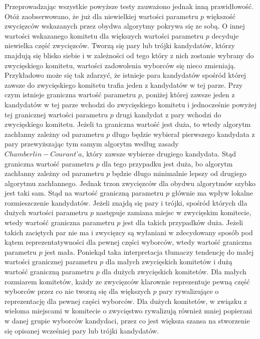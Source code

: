 \documentclass[pdflatex,11pt]{../aghdoc_version2}
\begin{document}
Przeprowadzając wszystkie powyższe testy zauważono jednak inną prawidłowość. Otóż zaobserwowano, że już dla niewielkiej wartości parametru $p$ większość zwycięzców wskazanych przez obydwa algorytmy pokrywa się ze sobą. O innej wartości wskazanego komitetu dla większych wartości parametru $p$ decyduje niewielka część zwycięzców. Tworzą się pary lub trójki kandydatów, którzy znajdują się blisko siebie i w zależności od tego który z nich zostanie wybrany do zwycięskiego komitetu, wartości zadowolenia wyborców się nieco zmieniają. Przykładowo może się tak zdarzyć, że istnieje para kandydatów spośród której zawsze do zwycięskiego komitetu trafia jeden z kandydatów w tej parze. Przy czym istnieje graniczna wartość parametru $p$, poniżej której zawsze jeden z kandydatów w tej parze wchodzi do zwycięskiego komitetu i jednocześnie powyżej tej granicznej wartości parametru $p$ drugi kandydat z pary wchodzi do zwycięskiego komitetu. Jeżeli ta graniczna wartość jest duża, to wtedy algorytm zachłanny zależny od parametru $p$ długo będzie wybierał pierwszego kandydata z pary przewyższając tym samym algorytm według zasady $Chamberlin-Courant’a$, który zawsze wybierze drugiego kandydata. Stąd graniczna wartość parametru $p$ dla tego przypadku jest duża, bo algorytm zachłanny zależny od parametru $p$ będzie długo minimalnie lepszy od drugiego algorytmu zachłannego. Jednak trzon zwycięzców dla obydwu algorytmów szybko jest taki sam. Stąd na wartość graniczną parametru $p$ głównie ma wpływ lokalne rozmieszczenie kandydatów. Jeżeli znajdą się pary i trójki, spośród których dla dużych wartości parametru $p$ następuje zamiana miejsc w zwycięskim komitecie, wtedy wartość graniczna parametru $p$ jest dla takich przypadków duża. Jeżeli takich zaciętych par nie ma i zwycięzcy są wyłaniani w zdecydowany sposób pod kątem reprezentatywności dla pewnej części wyborców, wtedy wartość graniczna parametru $p$ jest mała. Poniekąd taka interpretacja tłumaczy tendencję do małej wartości granicznej parametru $p$ dla małych zwycięskich komitetów i dużą wartość graniczną parametru $p$ dla dużych zwycięskich komitetów. Dla małych rozmiarem komitetów, każdy ze zwycięzców klarownie reprezentuje pewną część wyborców przez co nie tworzą się dla większych $p$ pary rywalizujące o reprezentację dla pewnej części wyborców. Dla dużych komitetów, w związku z wieloma miejscami w komitecie o zwycięstwo rywalizują również mniej popierani w danej grupie wyborców kandydaci, przez co jest większa szansa na stworzenie się opisanej wcześniej pary lub trójki kandydatów.
\end{document}
